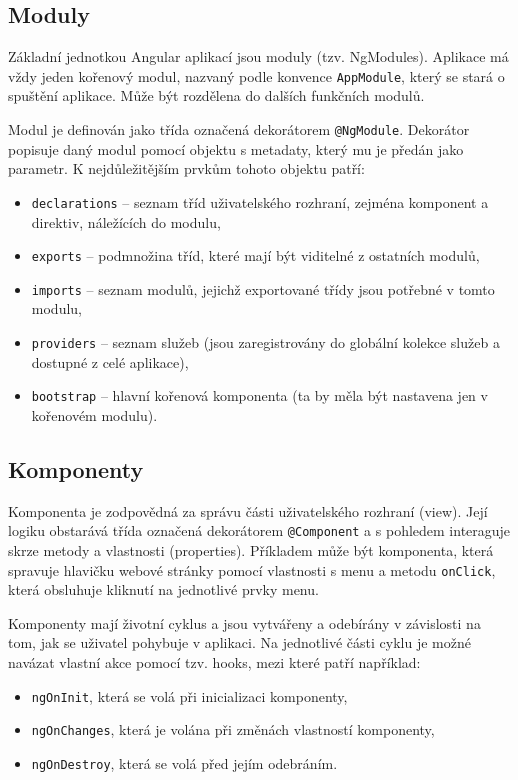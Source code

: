 \documentclass[
  digital, %
  oneside, %
  table,   %
  nolof,     %
  nolot,     %
]{fithesis3}
\begin{document}
\subsection{Moduly}
Základní jednotkou Angular aplikací jsou moduly (tzv. NgModules). Aplikace má vždy jeden kořenový modul, nazvaný podle konvence \verb|AppModule|, který se stará o spuštění aplikace. Může být rozdělena do dalších funkčních modulů.\par
Modul je definován jako třída označená dekorátorem \verb|@NgModule|. Dekorátor popisuje daný modul pomocí objektu s metadaty, který mu je předán jako parametr. K nejdůležitějším prvkům tohoto objektu patří: \cite{angulario}
\begin{itemize}
  \item \verb|declarations| – seznam tříd uživatelského rozhraní, zejména komponent a direktiv, náležících do modulu,
  \item \verb|exports| – podmnožina tříd, které mají být viditelné z ostatních modulů,
  \item \verb|imports| – seznam modulů, jejichž exportované třídy jsou potřebné v tomto modulu,
  \item \verb|providers| – seznam služeb (jsou zaregistrovány do globální kolekce služeb a dostupné z celé aplikace),
  \item \verb|bootstrap| – hlavní kořenová komponenta (ta by měla být nastavena jen v kořenovém modulu).
\end{itemize}

\subsection{Komponenty}
Komponenta je zodpovědná za správu části uživatelského rozhraní (view). Její logiku obstarává třída označená dekorátorem \verb|@Component| a s pohledem interaguje skrze metody a vlastnosti (properties). Příkladem může být komponenta, která spravuje hlavičku webové stránky pomocí vlastnosti s menu a metodu \verb|onClick|, která obsluhuje kliknutí na jednotlivé prvky menu.\par
Komponenty mají životní cyklus a jsou vytvářeny a odebírány v závislosti na tom, jak se uživatel pohybuje v aplikaci. Na jednotlivé části cyklu je možné navázat vlastní akce pomocí tzv. hooks, mezi které patří například: \cite{angulario}
\begin{itemize}
  \item \verb|ngOnInit|, která se volá při inicializaci komponenty,
  \item \verb|ngOnChanges|, která je volána při změnách vlastností komponenty,
  \item \verb|ngOnDestroy|, která se volá před jejím odebráním.
\end{itemize}
\end{document}
